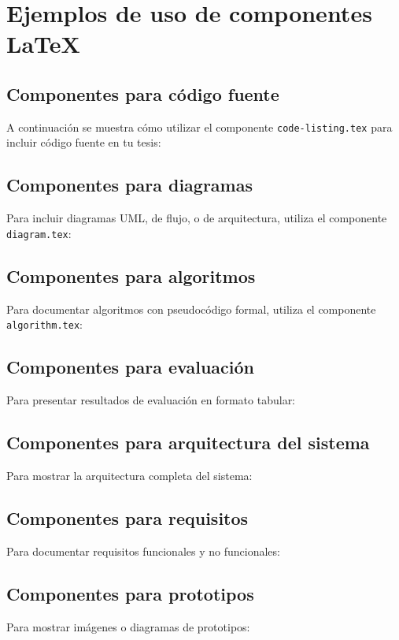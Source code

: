 
\chapter*{Ejemplos de uso de componentes LaTeX}

\section*{Componentes para código fuente}
A continuación se muestra cómo utilizar el componente \texttt{code-listing.tex} para incluir código fuente en tu tesis:


\section*{Componentes para diagramas}
Para incluir diagramas UML, de flujo, o de arquitectura, utiliza el componente \texttt{diagram.tex}:


\section*{Componentes para algoritmos}
Para documentar algoritmos con pseudocódigo formal, utiliza el componente \texttt{algorithm.tex}:


\section*{Componentes para evaluación}
Para presentar resultados de evaluación en formato tabular:


\section*{Componentes para arquitectura del sistema}
Para mostrar la arquitectura completa del sistema:


\section*{Componentes para requisitos}
Para documentar requisitos funcionales y no funcionales:


\section*{Componentes para prototipos}
Para mostrar imágenes o diagramas de prototipos:


